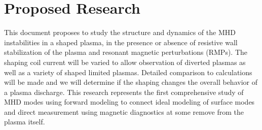 \documentclass[aps,preprint,showpacs,superscriptaddress,groupedaddress]{revtex4}  %
\begin{document}
\section{Proposed Research}
	This document proposes to study the structure and dynamics of the MHD instabilities in a shaped plasma, in the presence or absence of resistive wall  stabilization of the plasma and resonant magnetic perturbations (RMPs).  The shaping coil current will be varied to allow observation of diverted plasmas as well as a variety of shaped limited plasmas.  Detailed comparison to calculations will be made and we will determine if the shaping changes the overall behavior of a plasma discharge.  This research represents the first comprehensive study of MHD modes using forward modeling to connect ideal modeling of surface modes and direct measurement using magnetic diagnostics at some remove from the plasma itself.\par
\end{document}
